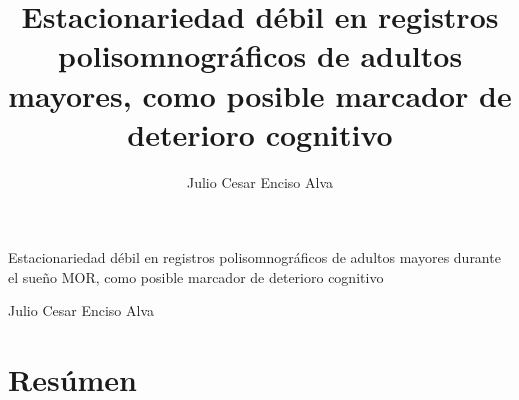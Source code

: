 \documentclass[12pt,a4paper]{mitthesis}
\begin{document}

\setcounter{page}{0}
\thispagestyle{empty}

\title{Estacionariedad d\'ebil en registros polisomnogr\'aficos de adultos mayores,
como posible marcador de deterioro cognitivo}
%
\author{Julio Cesar Enciso Alva}

\begin{center}
\huge{Estacionariedad d\'ebil en registros polisomnogr\'aficos de adultos mayores durante el
sue\~no MOR, como posible marcador de deterioro cognitivo}


\Large{Julio Cesar Enciso Alva}
\end{center}

\newpage


\setcounter{page}{1}

\chapter*{Res\'umen}
\end{document}
